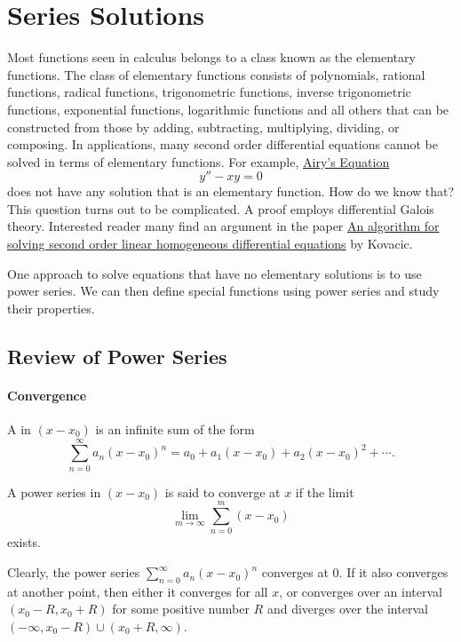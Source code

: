 \chapter{Series Solutions}

Most functions seen in calculus belongs to a class known as the elementary functions. 
The class of elementary functions consists of polynomials, rational functions, radical functions, trigonometric functions, inverse trigonometric functions, exponential functions, logarithmic functions and all others that can be constructed from those by adding, subtracting, multiplying, dividing, or composing. 
In applications, many second order differential equations cannot be solved in terms of elementary functions. For example, \href{https://en.wikipedia.org/wiki/Airy_function}{Airy's Equation}
\[y''-xy=0\] 
does not have any solution that is an elementary function. How do we know that? This question turns out to be complicated. A proof employs differential Galois theory. Interested reader many find an argument in the paper \href{https://www.sciencedirect.com/science/article/pii/S0747717186800104}{An algorithm for solving second order linear homogeneous differential equations} by Kovacic.

One approach to solve equations that have no elementary solutions is to use power series. We can then define special functions using power series and study their properties.

\section{Review of Power Series}
\subsubsection*{Convergence}
A  in $(x-x_0)$ is an infinite sum of the form
\[\sum\limits_{n=0}^\infty a_n(x-x_0)^n=a_0+a_1(x-x_0)+a_2(x-x_0)^2+\cdots.\]

A power series in $(x-x_0)$ is said to converge at $x$ if the limit
\[\lim\limits_{m\to \infty}\sum\limits_{n=0}^m(x-x_0)\]
exists.

Clearly, the power series $\sum\limits_{n=0}^\infty a_n(x-x_0)^n$ converges at $0$. If it also converges at another point, then either it converges for all $x$, or converges over an interval $(x_0-R, x_0+R)$ for some positive number $R$ and diverges over the interval $(-\infty, x_0-R)\cup (x_0+R,\infty)$.

